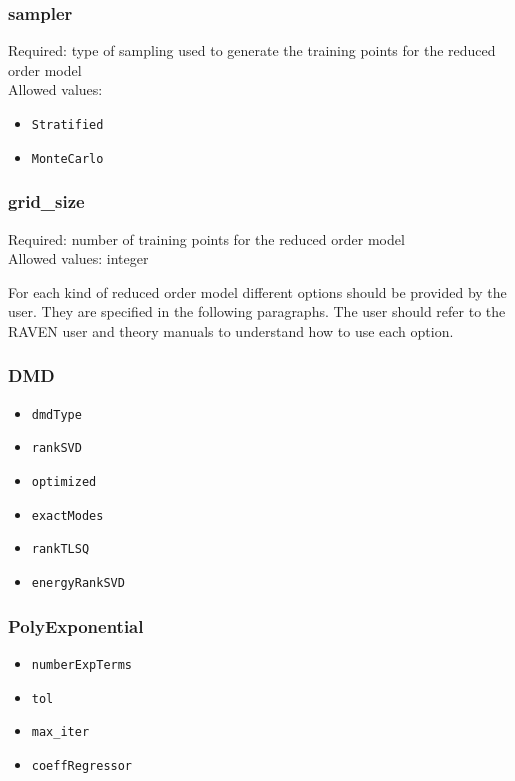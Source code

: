 \documentclass[oneside]{book}
\begin{document}
\subsubsection{sampler} Required: type of sampling used to generate the training points for the reduced order model
\\Allowed values: 
\begin{itemize}
    \item \verb|Stratified|
    \item \verb|MonteCarlo|
\end{itemize}

\subsubsection{grid\_size} Required: number of training points for the reduced order model
\\Allowed values: integer

For each kind of reduced order model different options should be provided by the user. They are specified in the following paragraphs. The user should refer to the RAVEN user \cite{rabiti_raven_2021} and theory \cite{alfonsi_raven_2021} manuals to understand how to use each option. 

\subsubsection{DMD}
\begin{itemize}
    \item \verb|dmdType|
    \item \verb|rankSVD|
    \item \verb|optimized|
    \item \verb|exactModes|
    \item \verb|rankTLSQ|
    \item \verb|energyRankSVD|
\end{itemize}


\subsubsection{PolyExponential}
\begin{itemize}
    \item \verb|numberExpTerms|
    \item \verb|tol|
    \item \verb|max_iter|
    \item \verb|coeffRegressor|
\end{itemize}
\end{document}
